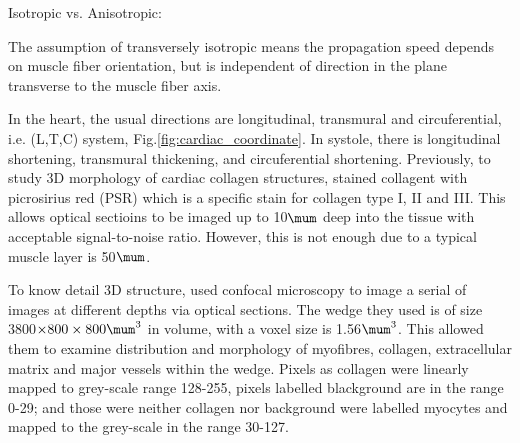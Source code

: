 \begin{framed}
Isotropic vs. Anisotropic:

The assumption of transversely isotropic means the propagation speed depends on
muscle fiber orientation, but is independent of direction in the plane
transverse to the muscle fiber axis.
\end{framed}
 
In the heart, the usual directions are longitudinal, transmural and
circuferential, i.e. (L,T,C) system, Fig.\ref{fig:cardiac_coordinate}. In
systole, there is longitudinal shortening, transmural thickening, and
circuferential shortening. Previously, to study 3D morphology of cardiac collagen structures,
\citep{dolber1993} stained collagent with picrosirius red (PSR) which is a
specific stain for collagen type I, II and III.
This allows optical sectioins to be imaged up to 10$\mum$ deep into the tissue
with acceptable signal-to-noise ratio. However, this is not enough due to a
typical muscle layer is 50$\mum$.

To know detail 3D structure, \citep{Young1998} used
confocal microscopy to image a serial of images at different depths via optical
sections. The wedge they used is of size 3800$\times 800\times 800 \mum^3$ in
volume, with a voxel size is 1.56$\mum^3$. This allowed them to examine
distribution and morphology of myofibres, collagen, extracellular matrix and
major vessels within the wedge. Pixels as collagen were linearly mapped to
grey-scale  range 128-255, pixels labelled blackground are in the range 0-29;
and those were neither collagen nor background were labelled myocytes and mapped
to the grey-scale in the range 30-127.

